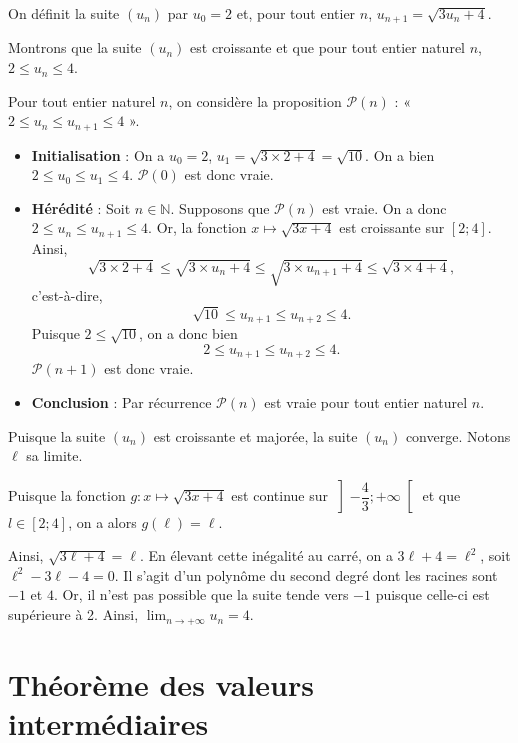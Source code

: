 \documentclass[11pt,fleqn, openany]{book} %
\begin{document}
\begin{example}On définit la suite $(u_n)$ par $u_0=2$ et, pour tout entier $n$, $u_{n+1}=\sqrt{3u_n+4}$.

Montrons que la suite $(u_n)$ est croissante et que pour tout entier naturel $n$, $2 \leqslant u_n \leqslant 4$.

Pour tout entier naturel $n$, on considère la proposition $\mathcal{P}(n)$ : « $2\leqslant u_n \leqslant u_{n+1} \leqslant 4$ ».

\begin{itemize}
\item \textbf{Initialisation} : On a $u_0=2$, $u_1=\sqrt{3 \times 2 + 4} =\sqrt{10}$. On a bien $2\leqslant u_0 \leqslant u_{1} \leqslant 4$. $\mathcal{P}(0)$ est donc vraie.
\item \textbf{Hérédité} : Soit $n\in\mathbb{N}$. Supposons que $\mathcal{P}(n)$ est vraie. On a donc $2\leqslant u_n \leqslant u_{n+1} \leqslant 4$.
Or, la fonction $x\mapsto \sqrt{3x+4}$ est croissante sur $[2;4]$. Ainsi, \[\sqrt{3 \times 2+4} \leqslant \sqrt{3 \times u_n +4} \leqslant \sqrt{3 \times u_{n+1} +4} \leqslant \sqrt{3 \times 4 +4},\] c'est-à-dire, \[\sqrt{10} \leqslant u_{n+1} \leqslant u_{n+2} \leqslant 4.\] Puisque $2 \leqslant \sqrt{10}$, on a donc bien \[2\leqslant u_{n+1} \leqslant u_{n+2} \leqslant 4.\] $\mathcal{P}(n+1)$ est donc vraie.
\item \textbf{Conclusion} : Par récurrence $\mathcal{P}(n)$ est vraie pour tout entier naturel $n$.
\end{itemize}

Puisque la suite $(u_n)$ est croissante et majorée, la suite $(u_n)$ converge. Notons $\ell$ sa limite.

Puisque la fonction $g:x\mapsto \sqrt{3x+4}$ est continue sur $\left]-\dfrac{4}{3};+\infty \right[$ et que $l \in [2;4]$, on a alors $g(\ell)=\ell$.

Ainsi, $\sqrt{3\ell+4}=\ell$. En élevant cette inégalité au carré, on a $3\ell+4=\ell^2$, soit $\ell^2-3\ell-4=0$. Il s'agit d'un polynôme du second degré dont les racines sont $-1$ et $4$. Or, il n'est pas possible que la suite tende vers $-1$ puisque celle-ci est supérieure à 2. Ainsi, $\displaystyle\lim_{n \to+\infty}u_n=4$.

\end{example}

\newpage
\section{Théorème des valeurs intermédiaires}
\end{document}
